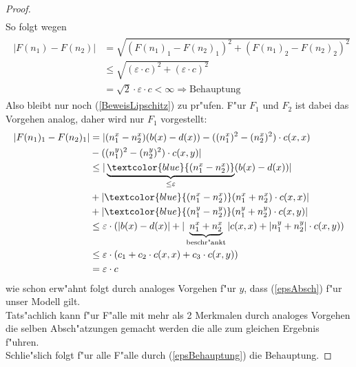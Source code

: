 \documentclass[11pt,a4paper]{article}
\theoremstyle{plain}
\newcommand{\eps}{\ensuremath{\varepsilon}}
\begin{document}
\begin{proof}
\begin{align}
	\end{align}
	So folgt wegen 
	\begin{align}
	\begin{split}
		|F(n_1) - F(n_2)| &= \sqrt{(F(n_1)_1 - F(n_2)_1)^2 + (F(n_1)_2 - F(n_2)_2)^2}\\
		&\le \sqrt{(\eps \cdot c)^2 + (\eps \cdot c)^2}\\
		&= \sqrt{2} \cdot \eps \cdot c < \infty \Rightarrow \text{Behauptung}
		\label{epsBehauptung}
	\end{split}
	\end{align}
	Also bleibt nur noch (\ref{BeweisLipschitz}) zu pr"ufen. F"ur $ F_1 $ und $ F_2 $ ist dabei das Vorgehen analog, daher wird nur $ F_1 $ vorgestellt:\\
	\begin{align*}
		|F(n_1)_1 - F(n_2)_1| & = |(n_1^x - n_2^x)(b(x) - d(x)) - ((n_1^x)^2 - (n_2^x)^2) \cdot c(x,x)\\
		&  - ((n_1^y)^2 - (n_2^y)^2) \cdot c(x,y) |\\
		& \le  |\underbrace{\textcolor{blue}{(n_1^x - n_2^x)}}_{ \le \eps}(b(x) - d(x)) |\\
		& + | \textcolor{blue}{(n_1^x - n_2^x)}(n_1^x + n_2^x) \cdot c(x,x) | \\
		& + | \textcolor{blue}{(n_1^y - n_2^y)}(n_1^y + n_2^y) \cdot c(x,y) |\\
		& \le \eps \cdot (| b(x) - d(x) | +  |\underbrace{n_1^x + n_2^x}_{\text{beschr"ankt}}| c(x,x) + | n_1^y + n_2^y | \cdot c(x,y))\\
		& \le \eps \cdot ( c_1 + c_2 \cdot c(x,x) + c_3 \cdot c(x,y) )\\
		& = \eps \cdot c
	\end{align*}
	wie schon erw"ahnt folgt durch analoges Vorgehen f"ur $ y $, dass (\ref{epsAbsch}) f"ur unser Modell gilt.\\ 
	Tats"achlich kann f"ur F"alle mit mehr als 2 Merkmalen durch analoges Vorgehen die selben Absch"atzungen gemacht werden die alle zum gleichen Ergebnis f"uhren.\\
	Schlie"slich folgt f"ur alle F"alle durch (\ref{epsBehauptung}) die Behauptung.
\end{proof}

\end{document}
